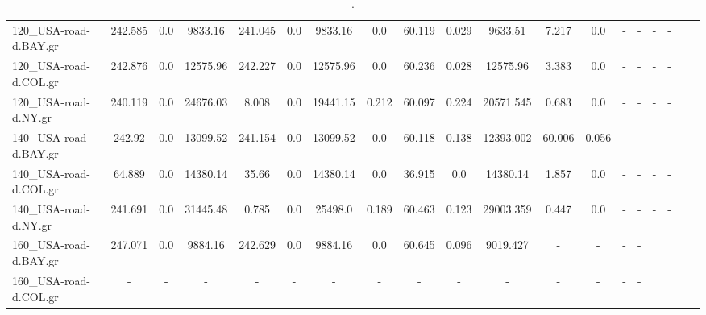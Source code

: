 \begin{sidewaystable}[!h]
\begin{tabular}{lcccccccccccccccccc}
120_USA-road-d.BAY.gr & 242.585 & 0.0 & 9833.16 & 241.045 & 0.0 & 9833.16 & 0.0 & 60.119 & 0.029 & 9633.51 & 7.217 & 0.0 & - & - & - & - \\
120_USA-road-d.COL.gr & 242.876 & 0.0 & 12575.96 & 242.227 & 0.0 & 12575.96 & 0.0 & 60.236 & 0.028 & 12575.96 & 3.383 & 0.0 & - & - & - & - \\
120_USA-road-d.NY.gr & 240.119 & 0.0 & 24676.03 & 8.008 & 0.0 & 19441.15 & 0.212 & 60.097 & 0.224 & 20571.545 & 0.683 & 0.0 & - & - & - & - \\
140_USA-road-d.BAY.gr & 242.92 & 0.0 & 13099.52 & 241.154 & 0.0 & 13099.52 & 0.0 & 60.118 & 0.138 & 12393.002 & 60.006 & 0.056 & - & - & - & - \\
140_USA-road-d.COL.gr & 64.889 & 0.0 & 14380.14 & 35.66 & 0.0 & 14380.14 & 0.0 & 36.915 & 0.0 & 14380.14 & 1.857 & 0.0 & - & - & - & - \\
140_USA-road-d.NY.gr & 241.691 & 0.0 & 31445.48 & 0.785 & 0.0 & 25498.0 & 0.189 & 60.463 & 0.123 & 29003.359 & 0.447 & 0.0 & - & - & - & - \\
160_USA-road-d.BAY.gr & 247.071 & 0.0 & 9884.16 & 242.629 & 0.0 & 9884.16 & 0.0 & 60.645 & 0.096 & 9019.427 & - & - & - & - \\
160_USA-road-d.COL.gr & - & - & - & - & - & - & - & - & - & - & - & - & - & - \\
\bottomrule
\end{tabular}
\caption{.}
\label{tab:}
\end{sidewaystable}
